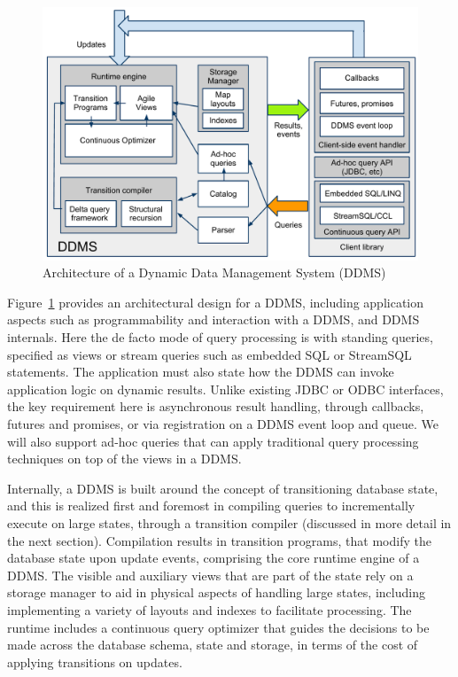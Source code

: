 \begin{figure}
\begin{center}
\includegraphics[scale=0.35]{graphics/CIDRarch.pdf}
\end{center}
\caption{Architecture of a Dynamic Data Management System (DDMS)}
\label{fig:ddmsarch}
\end{figure}


Figure~\ref{fig:ddmsarch} provides an architectural design for a DDMS, including
application aspects such as programmability and interaction with a DDMS, and
DDMS internals. Here the de facto mode of query processing is with standing
queries, specified as views or stream queries such as embedded SQL or StreamSQL
statements. The application must also state how the DDMS can invoke application
logic on dynamic results. Unlike existing JDBC or ODBC interfaces, the key
requirement here is asynchronous result handling, through callbacks, futures and
promises, or via registration on a DDMS event loop and queue. We will also
support ad-hoc queries that can apply traditional query processing techniques on
top of the views in a DDMS.






Internally, a DDMS is built around the concept of transitioning database state,
and this is realized first and foremost in compiling queries to
incrementally execute on large states, through a transition compiler (discussed
in more detail in the next section). Compilation results in transition programs,
that modify the database state upon update events, comprising the core runtime
engine of a DDMS. The visible and auxiliary views that are part of the state
rely on a storage manager to aid in physical aspects of handling large states,
including implementing a variety of layouts and indexes to facilitate
processing. The runtime includes a continuous query optimizer that guides the
decisions to be made across the database schema, state and storage, in terms of
the cost of applying transitions on updates.










